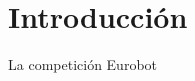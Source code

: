 \documentclass{beamer}
\begin{document}


\section{Introducción}

\begin{frame}{La competición Eurobot}
\begin{center}
\end{center}
\end{frame}
\end{document}
